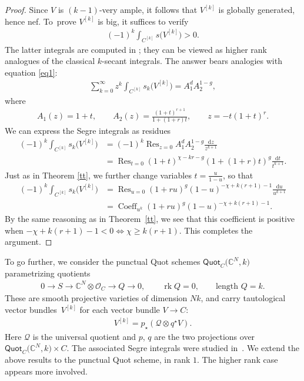 \documentclass[pdftex]{sigma}
\numberwithin{equation}{section}
\newcommand{\rk}{\operatorname{rk}}
\begin{document}
\begin{proof}
Since $V$ is $(k-1)$-very ample, it follows that $V^{[k]}$ is globally generated, hence nef. To~prove $V^{[k]}$ is big, it suffices to verify
\begin{gather*}
(-1)^k \int_{C^{[k]}} s\big(V^{[k]}\big)>0.
\end{gather*}
The latter integrals are computed in \cite[Theorem 2]{MOP1}; they can be viewed as higher rank analogues of the classical $k$-secant integrals. The answer bears analogies with equation \eqref{eq1}:
\begin{gather*}
\sum_{k=0}^{\infty} z^k \int_{C^{[k]}} s_{k} \big(V^{[k]}\big) =A_1^{d} A_2^{1-g},
\end{gather*}
where
\begin{gather*}
A_1(z)=1+t, \qquad A_2(z)=\frac{(1+t)^{r+1}}{1+(1+r)t}, \qquad z=-t(1+t)^r.
\end{gather*}
We can express the Segre integrals as residues
\begin{align*}
(-1)^k \int_{C^{[k]}} s_{k} \big(V^{[k]}\big)&=(-1)^k \operatorname{Res}_{z=0} A_1^d A_2^{1-g} \frac{\mathrm dz}{z^{k+1}}
\\
&=\operatorname{Res}_{t=0} (1+t)^{\chi - kr - g} (1+(1+r)t)^{g} \frac{\mathrm dt}{t^{k+1}}.
\end{align*}
Just as in Theorem \ref{tt}, we further change variables $t=\frac{u}{1-u}$, so that
\begin{align*}
(-1)^k \int_{C^{[k]}} s_{k} \big(V^{[k]}\big)&=\operatorname{Res}_{u=0} (1+ru)^{g} (1-u)^{-\chi+k(r+1)-1} \frac{\mathrm du}{u^{k+1}}
\\
&= \operatorname{Coeff}_{u^k} (1+ru)^{g} (1-u)^{-\chi+k(r+1)-1}.
\end{align*}
By the same reasoning as in Theorem~\ref{tt}, we see that this coefficient is positive when $-\chi+k(r+1)-1<0\iff \chi\geq k(r+1)$. This completes the argument.
\end{proof}

To go further, we consider the punctual Quot schemes $\mathsf {Quot}_C\big(\mathbb C^N, k\big)$ parametrizing quotients
\begin{gather*}
0\to S\to \mathbb C^N\otimes \mathcal O_C\to Q\to 0, \qquad \rk Q=0, \qquad \text{length }Q=k.
\end{gather*}
These are smooth projective varieties of dimension $Nk$, and carry tautological vector bundles~$V^{[k]}$ for each vector bundle $V\to C$:
\begin{gather*}
V^{[k]}=p_{\star} (\mathcal Q\otimes q^{\star} V).
\end{gather*}
Here $\mathcal Q$ is the universal quotient and $p$, $q$ are the two projections over $\mathsf{Quot}_C\big(\mathbb C^N, k\big)\times C$.
The associated Segre integrals were studied in~\cite{OP2021}. We extend the above results to the punctual Quot scheme, in rank $1$. The higher rank case appears more involved.
\end{document}
